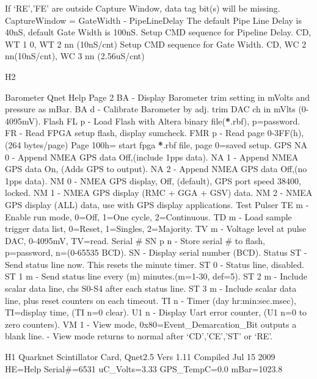 \documentclass[letterpaper,10pt,english]{sphinxmanual}
\begin{document}
If `RE','FE' are outside Capture Window, data tag bit(s) will be missing.
CaptureWindow = GateWidth - PipeLineDelay
The default Pipe Line Delay is 40nS, default Gate Width is 100nS.
Setup CMD sequence for Pipeline Delay.  CD,  WT 1 0, WT 2 nn (10nS/cnt)
Setup CMD sequence for Gate Width.  CD, WC 2 nn(10nS/cnt), WC 3 nn (2.56uS/cnt)

H2

Barometer      Qnet Help Page 2
BA      - Display Barometer trim setting in mVolts and pressure as mBar.
BA d    - Calibrate Barometer by adj. trim DAC ch in mVlts (0-4095mV).
Flash
FL p    - Load Flash with Altera binary file({\color{red}\bfseries{}*}.rbf), p=password.
FR      - Read FPGA setup flash, display sumcheck.
FMR p   - Read page 0-3FF(h), (264 bytes/page)
Page 100h= start fpga {\color{red}\bfseries{}*}.rbf file, page 0=saved setup.
GPS
NA 0    - Append NMEA GPS data Off,(include 1pps data).
NA 1    - Append NMEA GPS data On, (Adds GPS to output).
NA 2    - Append NMEA GPS data Off,(no 1pps data).
NM 0    - NMEA GPS display, Off, (default), GPS port speed 38400, locked.
NM 1    - NMEA GPS display (RMC + GGA + GSV) data.
NM 2    - NMEA GPS display (ALL) data, use with GPS display applications.
Test Pulser
TE m    - Enable run mode,  0=Off, 1=One cycle, 2=Continuous.
TD m    - Load sample trigger data list, 0=Reset, 1=Singles, 2=Majority.
TV m    - Voltage level at pulse DAC, 0-4095mV, TV=read.
Serial \#
SN p n  - Store serial \# to flash, p=password, n=(0-65535 BCD).
SN      - Display serial number (BCD).
Status
ST      - Send status line now.  This resets the minute timer.
ST 0    - Status line, disabled.
ST 1 m  - Send status line every (m) minutes.(m=1-30, def=5).
ST 2 m  - Include scalar data line, chs S0-S4 after each status line.
ST 3 m  - Include scalar data line, plus reset counters on each timeout.
TI n     - Timer (day hr:min:sec.msec), TI=display time, (TI n=0 clear).
U1 n     - Display Uart error counter, (U1 n=0 to zero counters).
VM 1     - View mode, 0x80=Event\_Demarcation\_Bit outputs a blank line.
- View mode returns to normal after `CD','CE','ST' or `RE'.

H1
Quarknet Scintillator Card,  Qnet2.5  Vers 1.11  Compiled Jul 15 2009  HE=Help
Serial\#=6531     uC\_Volts=3.33      GPS\_TempC=0.0     mBar=1023.8
\end{document}

